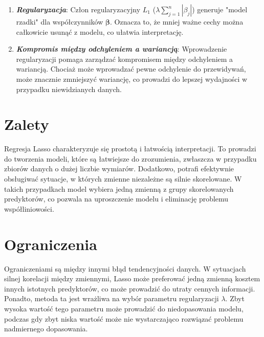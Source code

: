 \begin{enumerate}
    \item \textbf{\textit{Regularyzacja}}: Człon regularyzacyjny $L_1$ ($\lambda \sum_{j=1}^{n} |\beta_j|$) generuje "model rzadki" dla współczynników $\boldsymbol{ \beta }$. Oznacza to, że mniej ważne cechy można całkowicie usunąć z modelu, co ułatwia interpretację.
    
    \item \textbf{\textit{Kompromis między odchyleniem a wariancją}}: Wprowadzenie regularyzacji pomaga zarządzać kompromisem między odchyleniem a wariancją. Chociaż może wprowadzać pewne odchylenie do przewidywań, może znacznie zmniejszyć wariancję, co prowadzi do lepszej wydajności w przypadku niewidzianych danych.
\end{enumerate}

{}
\section*{Zalety}
\vspace{-1.0em}

\hspace{1.5cm} Regresja Lasso charakteryzuje się prostotą i łatwością interpretacji. To prowadzi do tworzenia modeli, które są łatwiejsze do zrozumienia, zwłaszcza w przypadku zbiorów danych o dużej liczbie wymiarów. Dodatkowo, potrafi efektywnie obsługiwać sytuacje, w których zmienne niezależne są silnie skorelowane. W takich przypadkach model wybiera jedną zmienną z grupy skorelowanych predyktorów, co pozwala na uproszczenie modelu i eliminację problemu współliniowości.

{}
\section*{Ograniczenia}
\vspace{-1.0em}


\hspace{1.5cm} Ograniczeniami są między innymi błąd tendencyjności danych. 
W sytuacjach silnej korelacji między zmiennymi, Lasso może preferować jedną zmienną kosztem innych istotnych predyktorów, co może prowadzić do utraty cennych informacji. 
Ponadto, metoda ta jest wrażliwa na wybór parametru regularyzacji $\lambda$. 
Zbyt wysoka wartość tego parametru może prowadzić do niedopasowania modelu, podczas gdy zbyt niska wartość może nie wystarczająco rozwiązać problemu nadmiernego dopasowania.

